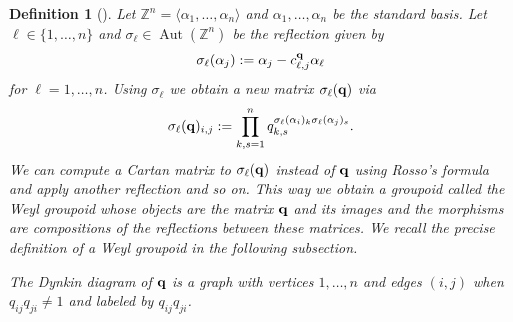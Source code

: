 \documentclass[10pt,a4paper]{amsart}
\numberwithin{equation}{section}
\newtheorem{Definition}[Theorem]{Definition}
\newcommand{\ZZ }{\mathbb{Z}}
\DeclareMathOperator{\Aut}{Aut}
\newcommand{\qq }{{\bf q}}
\begin{document}
\begin{Definition}[{\cite{p-H-06}}]
Let $\ZZ^n = \langle \alpha_1,\dots,\alpha_n\rangle$ and $\alpha_1,\dots,\alpha_n$ be the standard basis.
Let $\ell\in\{1,\dots,n\}$ and $\sigma_\ell\in\Aut(\ZZ^n)$ be the reflection given by
\[ \sigma_\ell(\alpha_j):=\alpha_j - c^\qq_{\ell,j}\alpha_\ell \]
for $\ell=1,\dots,n$. Using $\sigma_\ell$ we obtain a new matrix $\sigma_\ell(\qq)$ via
\begin{gather}\label{reflect_q}
\sigma_\ell(\qq)_{i,j} := \prod_{k,s=1}^n q_{k,s}^{\sigma_\ell(\alpha_i)_k \sigma_\ell(\alpha_j)_s}.
\end{gather}
We can compute a Cartan matrix to $\sigma_\ell(\qq)$ instead of $\qq$ using Rosso's formula and apply another reflection and so on.
This way we obtain a groupoid called the {\it Weyl groupoid} whose objects are the matrix $\qq$ and its images and the morphisms are compositions of the reflections between these matrices.
We recall the precise definition of a Weyl groupoid in the following subsection.

The {\it Dynkin diagram} of $\qq$ is a graph with vertices $1,\dots,n$ and edges $(i,j)$ when $q_{ij}q_{ji}\ne 1$ and labeled by $q_{ij}q_{ji}$.
\end{Definition}
\end{document}
